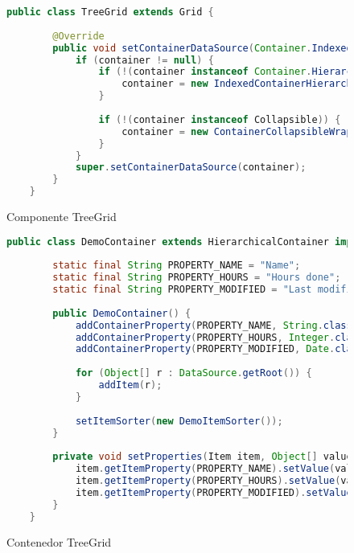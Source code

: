\begin{figure}[!tb]
	\centering
	\begin{lstlisting}[language=Java]
	public class TreeGrid extends Grid {
		
		@Override
		public void setContainerDataSource(Container.Indexed container) {
			if (container != null) {
				if (!(container instanceof Container.Hierarchical)) {
					container = new IndexedContainerHierarchicalWrapper(container);
				}
				
				if (!(container instanceof Collapsible)) {
					container = new ContainerCollapsibleWrapper(container);
				}
			}
			super.setContainerDataSource(container);
		}
	}
	\end{lstlisting}
	\caption{Componente TreeGrid}
	\label{fig:treeGrid}
\end{figure}






\begin{figure}[!tb]
	\centering
	\begin{lstlisting}[language=Java]
	public class DemoContainer extends HierarchicalContainer implements Collapsible, Measurable {
	
		static final String PROPERTY_NAME = "Name";
		static final String PROPERTY_HOURS = "Hours done";
		static final String PROPERTY_MODIFIED = "Last modified";
		
		public DemoContainer() {
			addContainerProperty(PROPERTY_NAME, String.class, "");
			addContainerProperty(PROPERTY_HOURS, Integer.class, 0);
			addContainerProperty(PROPERTY_MODIFIED, Date.class, new Date());
			
			for (Object[] r : DataSource.getRoot()) {
				addItem(r);
			}
			
			setItemSorter(new DemoItemSorter());
		}
		
		private void setProperties(Item item, Object[] values) {
			item.getItemProperty(PROPERTY_NAME).setValue(values[0]);
			item.getItemProperty(PROPERTY_HOURS).setValue(values[1]);
			item.getItemProperty(PROPERTY_MODIFIED).setValue(values[2]);
		}
	}
	\end{lstlisting}
	\caption{Contenedor TreeGrid}
	\label{fig:demoContainer}
\end{figure}

